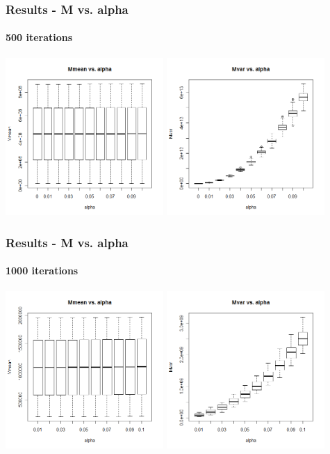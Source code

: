 \begin{frame}
    \frametitle{Results - M vs. alpha }
	\framesubtitle{500 iterations}
\hspace*{-5mm}
\includegraphics[height=6cm]{boxplot500_mmean_alpha}
\includegraphics[height=6cm]{boxplot500_mvar_alpha}
\end{frame}

\begin{frame}
    \frametitle{Results - M vs. alpha }
	\framesubtitle{1000 iterations}
\hspace*{-5mm}
\includegraphics[height=6cm]{boxplot1000_mmean_alpha}
\includegraphics[height=6cm]{boxplot1000_mvar_alpha}
\end{frame}





